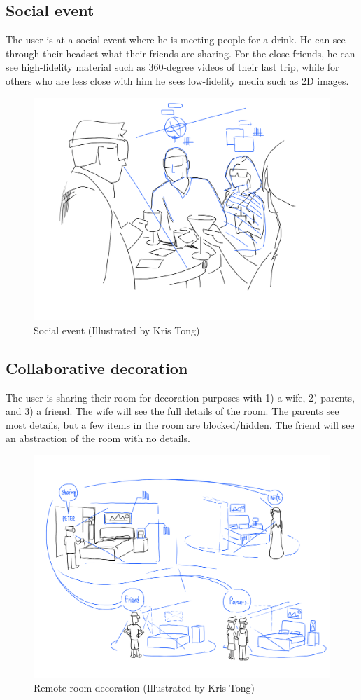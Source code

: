 \subsection{Social event}

The user is at a social event where he is meeting people for a drink. He can see through their headset what their friends are sharing. For the close friends, he can see high-fidelity material such as 360-degree videos of their last trip, while for others who are less close with him he sees low-fidelity media such as 2D images. 

\begin{figure}[H]
    \centering
    \includegraphics[width=0.8\linewidth]{images/illustrations/3_Bar_Scene.png}
    \caption{Social event (Illustrated by Kris Tong)}
    \label{fig:illustration:social-event}
\end{figure}

\subsection{Collaborative decoration}

The user is sharing their room for decoration purposes with 1) a wife, 2) parents, and 3) a friend. The wife will see the full details of the room. The parents see most details, but a few items in the room are blocked/hidden. The friend will see an abstraction of the room with no details. 

\begin{figure}[H]
    \centering
    \includegraphics[width=0.8\linewidth]{images/illustrations/1_Remote_Bed.png}
    \caption{Remote room decoration (Illustrated by Kris Tong)}
    \label{fig:illustration:remote-bed}
\end{figure}

